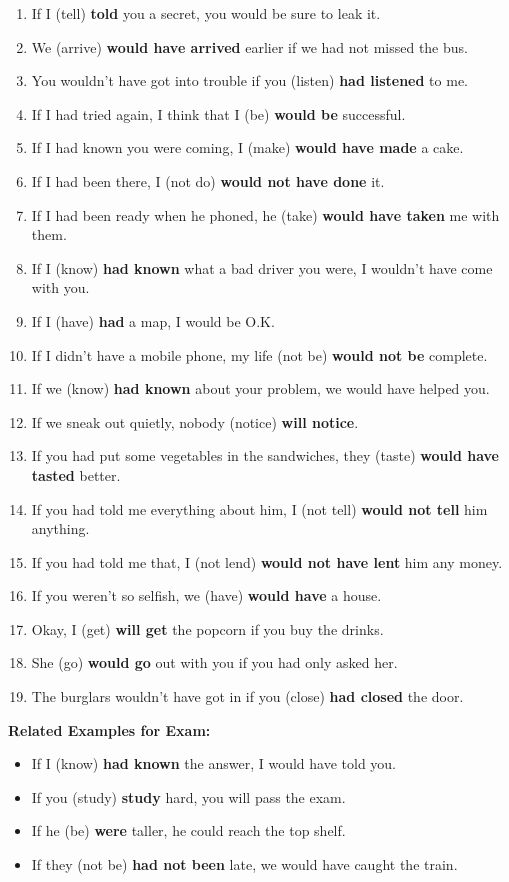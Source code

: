 \documentclass{article}
\begin{document}
\begin{enumerate}
    \item If I (tell) \textbf{told} you a secret, you would be sure to leak it.
    \item We (arrive) \textbf{would have arrived} earlier if we had not missed the bus.
    \item You wouldn't have got into trouble if you (listen) \textbf{had listened} to me.
    \item If I had tried again, I think that I (be) \textbf{would be} successful.
    \item If I had known you were coming, I (make) \textbf{would have made} a cake.
    \item If I had been there, I (not do) \textbf{would not have done} it.
    \item If I had been ready when he phoned, he (take) \textbf{would have taken} me with them.
    \item If I (know) \textbf{had known} what a bad driver you were, I wouldn't have come with you.
    \item If I (have) \textbf{had} a map, I would be O.K.
    \item If I didn't have a mobile phone, my life (not be) \textbf{would not be} complete.
    \item If we (know) \textbf{had known} about your problem, we would have helped you.
    \item If we sneak out quietly, nobody (notice) \textbf{will notice}.
    \item If you had put some vegetables in the sandwiches, they (taste) \textbf{would have tasted} better.
    \item If you had told me everything about him, I (not tell) \textbf{would not tell} him anything.
    \item If you had told me that, I (not lend) \textbf{would not have lent} him any money.
    \item If you weren’t so selfish, we (have) \textbf{would have} a house.
    \item Okay, I (get) \textbf{will get} the popcorn if you buy the drinks.
    \item She (go) \textbf{would go} out with you if you had only asked her.
    \item The burglars wouldn't have got in if you (close) \textbf{had closed} the door.
\end{enumerate}

\textbf{Related Examples for Exam:}
\begin{itemize}
    \item If I (know) \textbf{had known} the answer, I would have told you.
    \item If you (study) \textbf{study} hard, you will pass the exam.
    \item If he (be) \textbf{were} taller, he could reach the top shelf.
    \item If they (not be) \textbf{had not been} late, we would have caught the train.
\end{itemize}
\end{document}
